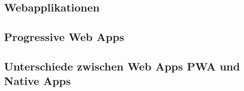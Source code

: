 \subsection{Webapplikationen}


\subsection{Progressive Web Apps}


\subsection{Unterschiede zwischen Web Apps PWA und Native Apps}

\newpage























